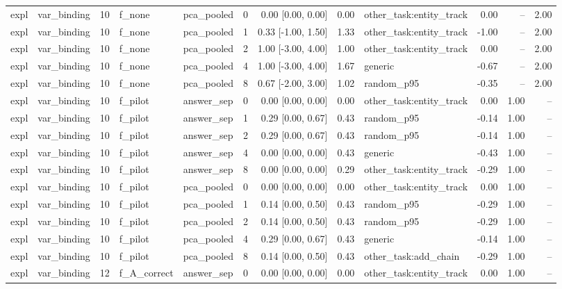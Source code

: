 \begin{tabular}{llrllrrrlrrr}
expl & var\_binding & 10 & f\_none & pca\_pooled & 0 & 0.00 [0.00, 0.00] & 0.00 & other\_task:entity\_track & 0.00 & -- & 2.00 \\
expl & var\_binding & 10 & f\_none & pca\_pooled & 1 & 0.33 [-1.00, 1.50] & 1.33 & other\_task:entity\_track & -1.00 & -- & 2.00 \\
expl & var\_binding & 10 & f\_none & pca\_pooled & 2 & 1.00 [-3.00, 4.00] & 1.00 & other\_task:entity\_track & 0.00 & -- & 2.00 \\
expl & var\_binding & 10 & f\_none & pca\_pooled & 4 & 1.00 [-3.00, 4.00] & 1.67 & generic & -0.67 & -- & 2.00 \\
expl & var\_binding & 10 & f\_none & pca\_pooled & 8 & 0.67 [-2.00, 3.00] & 1.02 & random\_p95 & -0.35 & -- & 2.00 \\
expl & var\_binding & 10 & f\_pilot & answer\_sep & 0 & 0.00 [0.00, 0.00] & 0.00 & other\_task:entity\_track & 0.00 & 1.00 & -- \\
expl & var\_binding & 10 & f\_pilot & answer\_sep & 1 & 0.29 [0.00, 0.67] & 0.43 & random\_p95 & -0.14 & 1.00 & -- \\
expl & var\_binding & 10 & f\_pilot & answer\_sep & 2 & 0.29 [0.00, 0.67] & 0.43 & random\_p95 & -0.14 & 1.00 & -- \\
expl & var\_binding & 10 & f\_pilot & answer\_sep & 4 & 0.00 [0.00, 0.00] & 0.43 & generic & -0.43 & 1.00 & -- \\
expl & var\_binding & 10 & f\_pilot & answer\_sep & 8 & 0.00 [0.00, 0.00] & 0.29 & other\_task:entity\_track & -0.29 & 1.00 & -- \\
expl & var\_binding & 10 & f\_pilot & pca\_pooled & 0 & 0.00 [0.00, 0.00] & 0.00 & other\_task:entity\_track & 0.00 & 1.00 & -- \\
expl & var\_binding & 10 & f\_pilot & pca\_pooled & 1 & 0.14 [0.00, 0.50] & 0.43 & random\_p95 & -0.29 & 1.00 & -- \\
expl & var\_binding & 10 & f\_pilot & pca\_pooled & 2 & 0.14 [0.00, 0.50] & 0.43 & random\_p95 & -0.29 & 1.00 & -- \\
expl & var\_binding & 10 & f\_pilot & pca\_pooled & 4 & 0.29 [0.00, 0.67] & 0.43 & generic & -0.14 & 1.00 & -- \\
expl & var\_binding & 10 & f\_pilot & pca\_pooled & 8 & 0.14 [0.00, 0.50] & 0.43 & other\_task:add\_chain & -0.29 & 1.00 & -- \\
expl & var\_binding & 12 & f\_A\_correct & answer\_sep & 0 & 0.00 [0.00, 0.00] & 0.00 & other\_task:entity\_track & 0.00 & 1.00 & -- \\

\end{tabular}
